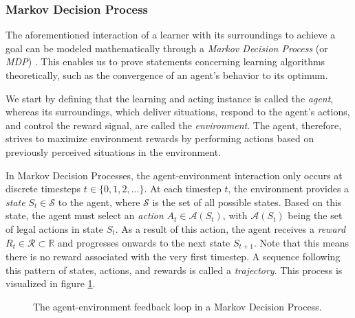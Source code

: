 \subsubsection{Markov Decision Process}
The aforementioned interaction of a learner with its surroundings to achieve a goal can be modeled mathematically through a \textit{Markov Decision Process} (or \textit{MDP}) \cite{bible}. This enables us to prove statements concerning learning algorithms theoretically, such as the convergence of an agent's behavior to its optimum.

We start by defining that the learning and acting instance is called the \textit{agent}, whereas its surroundings, which deliver situations, respond to the agent's actions, and control the reward signal, are called the \textit{environment}. The agent, therefore, strives to maximize environment rewards by performing actions based on previously perceived situations in the environment. 

In Markov Decision Processes, the agent-environment interaction only occurs at discrete timesteps $t \in \{0, 1, 2, ...\}$. At each timestep $t$, the environment provides a \textit{state} $S_t \in \mathscr{S}$ to the agent, where $\mathscr{S}$ is the set of all possible states. Based on this state, the agent must select an \textit{action} $A_t \in \mathscr{A}(S_t)$, with $\mathscr{A}(S_t)$ being the set of legal actions in state $S_t$. As a result of this action, the agent receives a \textit{reward} $R_t \in \mathscr{R} \subset \mathbb{R}$ and progresses onwards to the next state $S_{t+1}$. Note that this means there is no reward associated with the very first timestep. A sequence following this pattern of states, actions, and rewards is called a \textit{trajectory}. This process is visualized in figure \ref{fig:mdp_visualization}.

\begin{figure}[ht]
    \centering
    \caption{The agent-environment feedback loop in a Markov Decision Process.}
    \label{fig:mdp_visualization}
\end{figure}

